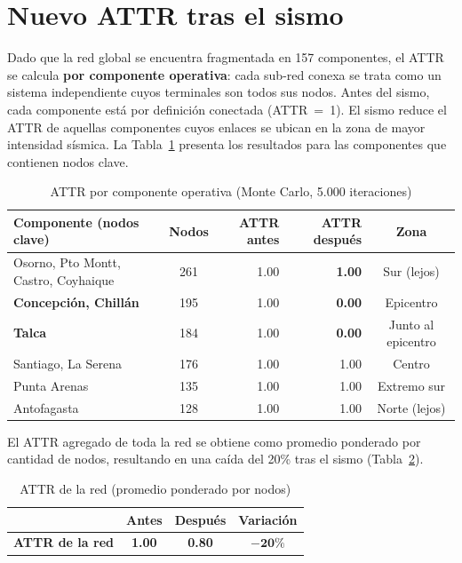 \documentclass[12pt,a4paper]{article}
\begin{document}
\section{Nuevo ATTR tras el sismo}

Dado que la red global se encuentra fragmentada en 157 componentes, el
ATTR se calcula \textbf{por componente operativa}: cada sub-red conexa se
trata como un sistema independiente cuyos terminales son todos sus nodos.
Antes del sismo, cada componente está por definición conectada (ATTR~=~1).
El sismo reduce el ATTR de aquellas componentes cuyos enlaces se ubican en
la zona de mayor intensidad sísmica.  La Tabla~\ref{tab:attr_comp}
presenta los resultados para las componentes que contienen nodos clave.

\begin{table}[H]
\centering
\caption{ATTR por componente operativa (Monte Carlo, 5.000 iteraciones)}
\label{tab:attr_comp}
\begin{tabular}{lcrrc}
\toprule
\textbf{Componente (nodos clave)} & \textbf{Nodos} & \textbf{ATTR antes} & \textbf{ATTR después} & \textbf{Zona} \\
\midrule
Osorno, Pto Montt, Castro, Coyhaique & 261 & 1.00 & \textbf{1.00} & Sur (lejos) \\
\textbf{Concepción, Chillán}         & 195 & 1.00 & \textbf{0.00} & Epicentro \\
\textbf{Talca}                       & 184 & 1.00 & \textbf{0.00} & Junto al epicentro \\
Santiago, La Serena                   & 176 & 1.00 & 1.00 & Centro \\
Punta Arenas                         & 135 & 1.00 & 1.00 & Extremo sur \\
Antofagasta                          & 128 & 1.00 & 1.00 & Norte (lejos) \\
\bottomrule
\end{tabular}
\end{table}

El ATTR agregado de toda la red se obtiene como promedio ponderado por
cantidad de nodos, resultando en una caída del 20\% tras el sismo
(Tabla~\ref{tab:attr_red}).

\begin{table}[H]
\centering
\caption{ATTR de la red (promedio ponderado por nodos)}
\label{tab:attr_red}
\begin{tabular}{lccc}
\toprule
& \textbf{Antes} & \textbf{Después} & \textbf{Variación} \\
\midrule
\textbf{ATTR de la red} & \textbf{1.00} & \textbf{0.80} & $\mathbf{-20\%}$ \\
\bottomrule
\end{tabular}
\end{table}
\end{document}
